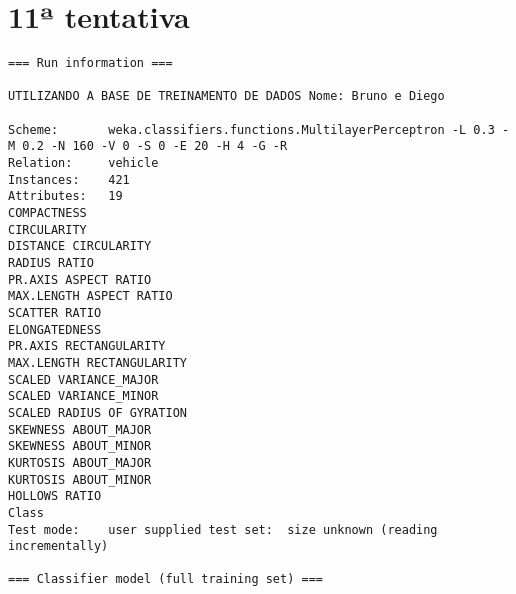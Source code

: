 \documentclass[
	article,			%
	11pt,				%
	oneside,			%
	a4paper,			%
	english,			%
	brazil,				%
	sumario=tradicional
	]{abntex2}
\begin{document}
\section{11ª tentativa}

\begin{lstlisting}
=== Run information ===

UTILIZANDO A BASE DE TREINAMENTO DE DADOS Nome: Bruno e Diego

Scheme:       weka.classifiers.functions.MultilayerPerceptron -L 0.3 -M 0.2 -N 160 -V 0 -S 0 -E 20 -H 4 -G -R
Relation:     vehicle
Instances:    421
Attributes:   19
COMPACTNESS
CIRCULARITY
DISTANCE CIRCULARITY
RADIUS RATIO
PR.AXIS ASPECT RATIO
MAX.LENGTH ASPECT RATIO
SCATTER RATIO
ELONGATEDNESS
PR.AXIS RECTANGULARITY
MAX.LENGTH RECTANGULARITY
SCALED VARIANCE_MAJOR
SCALED VARIANCE_MINOR
SCALED RADIUS OF GYRATION
SKEWNESS ABOUT_MAJOR
SKEWNESS ABOUT_MINOR
KURTOSIS ABOUT_MAJOR
KURTOSIS ABOUT_MINOR
HOLLOWS RATIO
Class
Test mode:    user supplied test set:  size unknown (reading incrementally)

=== Classifier model (full training set) ===


\end{lstlisting}
\end{document}
